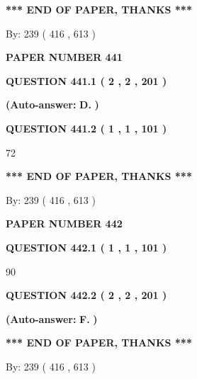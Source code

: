\documentclass{ctexart}
\begin{document}
 
   
   
   
   
\vspace{1.0in} 
{\textbf{\large{ *** END OF PAPER, THANKS *** }}} 
   
   
\hspace{1.0in} By: 
 239 ( 416 ,  613 )
   
   
   
   
\newpage 
\setcounter{page}{ 
   441001 } 
   
   
 {\textbf{ \Large{ PAPER NUMBER  441  }}}
   
   
   
   
  
  
{\textbf{\large{QUESTION
441.1 
 ( 2 , 2 , 201 )
}}}
 
 
{\textbf{(Auto-answer:}}
{\textbf{\large{
D.}}}
{\textbf{)}}
 
 
  
  
{\textbf{\large{QUESTION
441.2 
 ( 1 , 1 , 101 )
}}}

72
   
   
   
   
\vspace{1.0in} 
{\textbf{\large{ *** END OF PAPER, THANKS *** }}} 
   
   
\hspace{1.0in} By: 
 239 ( 416 ,  613 )
   
   
   
   
\newpage 
\setcounter{page}{ 
   442001 } 
   
   
 {\textbf{ \Large{ PAPER NUMBER  442  }}}
   
   
   
   
  
  
{\textbf{\large{QUESTION
442.1 
 ( 1 , 1 , 101 )
}}}

90
  
  
{\textbf{\large{QUESTION
442.2 
 ( 2 , 2 , 201 )
}}}
 
 
{\textbf{(Auto-answer:}}
{\textbf{\large{
F.}}}
{\textbf{)}}
 
 
   
   
   
   
\vspace{1.0in} 
{\textbf{\large{ *** END OF PAPER, THANKS *** }}} 
   
   
\hspace{1.0in} By: 
 239 ( 416 ,  613 )
   
   
   
   
\newpage 
\setcounter{page}{ 
   443001 } 
   
\end{document}
